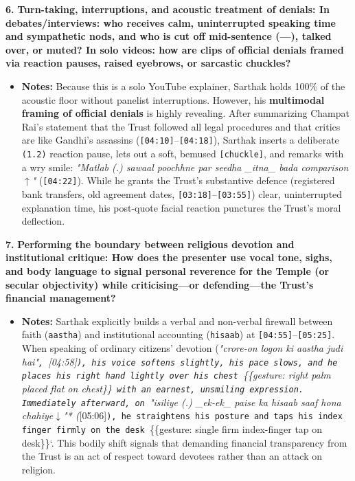 \documentclass[10pt,a4paper]{article}
\begin{document}
\noindent\textbf{6.} \textbf{Turn-taking, interruptions, and acoustic treatment of denials: In debates/interviews: who receives calm, uninterrupted speaking time and sympathetic nods, and who is cut off mid-sentence (---), talked over, or muted? In solo videos: how are clips of official denials framed via reaction pauses, raised eyebrows, or sarcastic chuckles?}\par\smallskip
\begin{itemize}
  \item \textbf{Notes:}
Because this is a solo YouTube explainer, Sarthak holds 100\% of the acoustic floor without panelist interruptions. However, his \textbf{multimodal framing of official denials} is highly revealing. After summarizing Champat Rai's statement that the Trust followed all legal procedures and that critics are like Gandhi's assassins (\texttt{[04:10]}--\texttt{[04:18]}), Sarthak inserts a deliberate \texttt{(1.2)} reaction pause, lets out a soft, bemused \texttt{[chuckle]}, and remarks with a wry smile: \textit{"Matlab (.) sawaal poochhne par seedha \_itna\_ bada comparison$\uparrow$"} (\texttt{[04:22]}). While he grants the Trust's substantive defence (registered bank transfers, old agreement dates, \texttt{[03:18]}--\texttt{[03:55]}) clear, uninterrupted explanation time, his post-quote facial reaction punctures the Trust's moral deflection.\par\smallskip
\end{itemize}

\noindent\textbf{7.} \textbf{Performing the boundary between religious devotion and institutional critique: How does the presenter use vocal tone, sighs, and body language to signal personal reverence for the Temple (or secular objectivity) while criticising---or defending---the Trust's financial management?}\par\smallskip
\begin{itemize}
  \item \textbf{Notes:}
Sarthak explicitly builds a verbal and non-verbal firewall between faith (\texttt{aastha}) and institutional accounting (\texttt{hisaab}) at \texttt{[04:55]}--\texttt{[05:25]}. When speaking of ordinary citizens' devotion (\textit{"crore-on logon ki aastha judi hai"\texttt{, }[04:58]\texttt{), his voice softens slightly, his pace slows, and he places his right hand lightly over his chest }\{\{gesture: right palm placed flat on chest\}\}\texttt{ with an earnest, unsmiling expression. Immediately afterward, on }"isiliye (.) \_ek-ek\_ paise ka hisaab saaf hona chahiye$\downarrow$"* (}[05:06]\texttt{), he straightens his posture and taps his index finger firmly on the desk }\{\{gesture: single firm index-finger tap on desk\}\}`. This bodily shift signals that demanding financial transparency from the Trust is an act of respect toward devotees rather than an attack on religion.\par\smallskip
\end{itemize}
\end{document}
